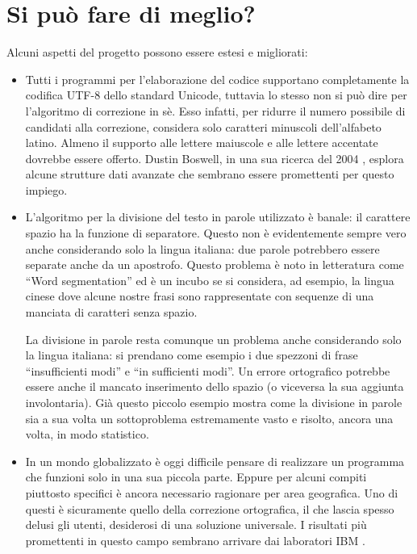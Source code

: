 \section{Si può fare di meglio?}
Alcuni aspetti del progetto possono essere estesi e migliorati:
\begin{itemize}
\item Tutti i programmi per l'elaborazione del codice supportano completamente la codifica UTF-8 dello standard Unicode, tuttavia lo stesso non si può dire per l'algoritmo di correzione in sè. Esso infatti, per ridurre il numero possibile di candidati alla correzione, considera solo caratteri minuscoli dell'alfabeto latino. Almeno il supporto alle lettere maiuscole e alle lettere accentate dovrebbe essere offerto. Dustin Boswell, in una sua ricerca del 2004 \cite{GeneratingCandidates}, esplora alcune strutture dati avanzate che sembrano essere promettenti per questo impiego.

\item L'algoritmo per la divisione del testo in parole utilizzato è banale: il carattere spazio ha la funzione di separatore. Questo non è evidentemente sempre vero anche considerando solo la lingua italiana: due parole potrebbero essere separate anche da un apostrofo. Questo problema è noto in letteratura come ``Word segmentation'' ed è un incubo se si considera, ad esempio, la lingua cinese dove alcune nostre frasi sono rappresentate con sequenze di una manciata di caratteri senza spazio. 

La divisione in parole resta comunque un problema anche considerando solo la lingua italiana: si prendano come esempio i due spezzoni di frase ``insufficienti modi'' e ``in sufficienti modi''. Un errore ortografico potrebbe essere anche il mancato inserimento dello spazio (o viceversa la sua aggiunta involontaria). Già questo piccolo esempio mostra come la divisione in parole sia a sua volta un sottoproblema estremamente vasto e risolto, ancora una volta, in modo statistico.

\item In un mondo globalizzato è oggi difficile pensare di realizzare un programma che funzioni solo in una sua piccola parte. Eppure per alcuni compiti piuttosto specifici è ancora necessario ragionare per area geografica. Uno di questi è sicuramente quello della correzione ortografica, il che lascia spesso delusi gli utenti, desiderosi di una soluzione universale. I risultati più promettenti in questo campo sembrano arrivare dai laboratori IBM \cite{languageindependent}.

\end{itemize}

